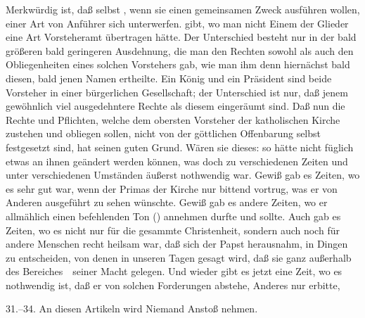 \begin{aufza}
{	Merkwürdig ist, daß selbst , wenn sie einen gemeinsamen Zweck ausführen wollen, einer Art von Anführer sich unterwerfen.}
gibt, wo man nicht Einem der Glieder eine Art Vorsteheramt übertragen hätte. Der Unterschied besteht nur in der bald größeren bald geringeren Ausdehnung, die man den Rechten sowohl als auch den Obliegenheiten eines solchen Vorstehers gab, wie man ihm denn hiernächst bald diesen, bald jenen Namen ertheilte. Ein König und ein Präsident sind beide Vorsteher in einer bürgerlichen Gesellschaft; der Unterschied ist nur, daß jenem gewöhnlich viel ausgedehntere Rechte als diesem eingeräumt sind. Daß nun die Rechte und Pflichten, welche dem obersten Vorsteher der katholischen Kirche zustehen und obliegen sollen, nicht von der göttlichen Offenbarung selbst festgesetzt sind, hat seinen guten Grund. Wären sie dieses: so hätte nicht füglich etwas an ihnen geändert werden können, was doch zu verschiedenen Zeiten und unter verschiedenen Umständen äußerst nothwendig war. Gewiß gab es Zeiten, wo es sehr gut war, wenn der Primas der Kirche nur bittend vortrug, was er von Anderen ausgeführt zu sehen wünschte. Gewiß gab es andere Zeiten, wo er allmählich einen befehlenden Ton () annehmen durfte und sollte. Auch gab es Zeiten, wo es nicht nur für die gesammte Christenheit, sondern auch noch für andere Menschen recht heilsam war, daß sich der Papst herausnahm, in Dingen zu entscheiden, von denen in unseren Tagen gesagt wird, daß sie ganz außerhalb des Bereiches~\ seiner Macht gelegen. Und wieder gibt es jetzt eine Zeit, wo es nothwendig ist, daß er von solchen Forderungen abstehe, Anderes nur erbitte, \usw\
\item[31.--34.]\setcounter{enumi}{34} An diesen Artikeln wird Niemand Anstoß nehmen.

\end{aufza}

